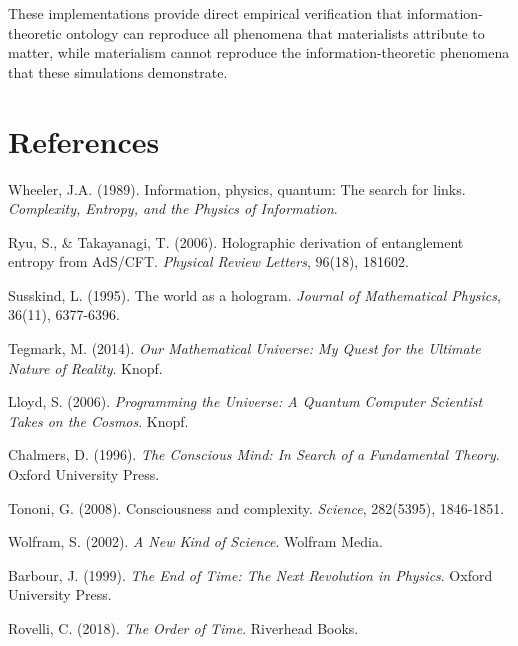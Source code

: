 \documentclass[12pt]{article}
\begin{document}
These implementations provide direct empirical verification that information-theoretic ontology can reproduce all phenomena that materialists attribute to matter, while materialism cannot reproduce the information-theoretic phenomena that these simulations demonstrate.

\section*{References}

\begin{thebibliography}{99}

Wheeler, J.A. (1989). Information, physics, quantum: The search for links. \emph{Complexity, Entropy, and the Physics of Information}.

Ryu, S., \& Takayanagi, T. (2006). Holographic derivation of entanglement entropy from AdS/CFT. \emph{Physical Review Letters}, 96(18), 181602.

Susskind, L. (1995). The world as a hologram. \emph{Journal of Mathematical Physics}, 36(11), 6377-6396.

Tegmark, M. (2014). \emph{Our Mathematical Universe: My Quest for the Ultimate Nature of Reality}. Knopf.

Lloyd, S. (2006). \emph{Programming the Universe: A Quantum Computer Scientist Takes on the Cosmos}. Knopf.

Chalmers, D. (1996). \emph{The Conscious Mind: In Search of a Fundamental Theory}. Oxford University Press.

Tononi, G. (2008). Consciousness and complexity. \emph{Science}, 282(5395), 1846-1851.

Wolfram, S. (2002). \emph{A New Kind of Science}. Wolfram Media.

Barbour, J. (1999). \emph{The End of Time: The Next Revolution in Physics}. Oxford University Press.

Rovelli, C. (2018). \emph{The Order of Time}. Riverhead Books.

\end{thebibliography}
\end{document}
